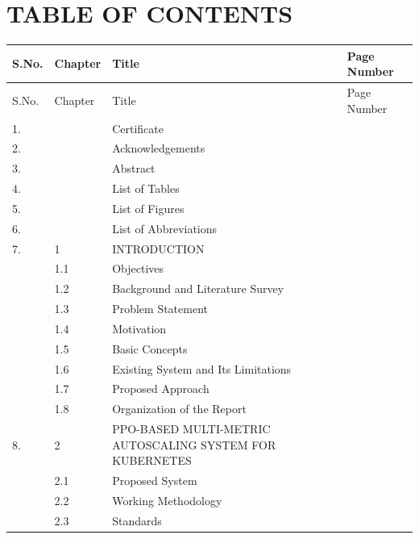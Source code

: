 \chapter*{\centering TABLE OF CONTENTS}
\label{ch:toc}

\begin{center}
\small
\renewcommand{\arraystretch}{0.9}
\begin{longtable}{p{1.1cm}p{1.5cm}p{9.2cm}p{2.1cm}}
\toprule
S.No. & Chapter & Title & Page Number \\
\midrule
\endfirsthead
\toprule
S.No. & Chapter & Title & Page Number \\
\midrule
\endhead
1. & & Certificate & \pageref{ch:certificate} \\
2. & & Acknowledgements & \pageref{ch:acknowledgements} \\
3. & & Abstract & \pageref{ch:abstract} \\
4. & & List of Tables & \pageref{ch:lot} \\
5. & & List of Figures & \pageref{ch:lof} \\
6. & & List of Abbreviations & \pageref{ch:abbreviations} \\
7. & 1 & INTRODUCTION & \pageref{ch:introduction} \\
 & 1.1 & Objectives & \pageref{sec:intro-objectives} \\
 & 1.2 & Background and Literature Survey & \pageref{sec:intro-background} \\
 & 1.3 & Problem Statement & \pageref{sec:problem-statement} \\
 & 1.4 & Motivation & \pageref{sec:intro-motivation} \\
 & 1.5 & Basic Concepts & \pageref{sec:intro-basics} \\
 & 1.6 & Existing System and Its Limitations & \pageref{sec:existing-system} \\
 & 1.7 & Proposed Approach & \pageref{sec:intro-proposed-approach} \\
 & 1.8 & Organization of the Report & \pageref{sec:intro-organization} \\
8. & 2 & PPO-BASED MULTI-METRIC AUTOSCALING SYSTEM FOR KUBERNETES & \pageref{ch:methodology} \\
 & 2.1 & Proposed System & \pageref{sec:proposed-system} \\
 & 2.2 & Working Methodology & \pageref{sec:working-methodology} \\
 & 2.3 & Standards & \pageref{sec:standards} \\

\end{longtable}
\end{center}
